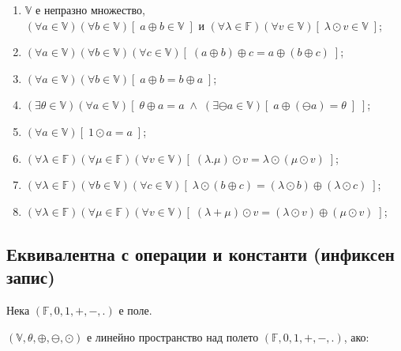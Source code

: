 \documentclass{article}[12pt]
\begin{document}
\begin{enumerate}
\item \(\mathbb{V}\) е непразно множество, \\
\((\forall a \in \mathbb{V})(\forall b \in \mathbb{V})[\; a \oplus b \in \mathbb{V}  \;]\)
и \((\forall \lambda \in \mathbb{F})(\forall v \in \mathbb{V})[\; \lambda \odot v \in \mathbb{V} \;]\);
\item \((\forall a \in \mathbb{V})(\forall b \in \mathbb{V})(\forall c \in \mathbb{V})[\; (a \oplus b) \oplus c = a \oplus (b \oplus c) \;]\);
\item \((\forall a \in \mathbb{V})(\forall b \in \mathbb{V})[\; a \oplus b = b \oplus a \;]\);
\item \((\exists \theta \in \mathbb{V})(\forall a \in \mathbb{V})[\; \theta \oplus a = a \; \land \; (\exists \ominus a \in \mathbb{V})[\; a \oplus (\ominus a) = \theta \;] \;]\);
\item \((\forall a \in \mathbb{V})[\; 1 \odot a = a \;]\);
\item \((\forall \lambda \in \mathbb{F})(\forall \mu \in \mathbb{F})(\forall v \in \mathbb{V})[\; (\lambda . \mu) \odot v = \lambda \odot (\mu \odot v) \;]\);
\item \((\forall \lambda \in \mathbb{F})(\forall b \in \mathbb{V})(\forall c \in \mathbb{V})[\; \lambda \odot (b \oplus c) = (\lambda \odot b) \oplus (\lambda \odot c) \;]\);
\item \((\forall \lambda \in \mathbb{F})(\forall \mu \in \mathbb{F})(\forall v \in \mathbb{V})[\; (\lambda + \mu) \odot v = (\lambda \odot v) \oplus (\mu \odot v) \;]\);
\end{enumerate}

\subsection{Еквивалентна с операции и константи (инфиксен запис)}

Нека \((\mathbb{F}, 0, 1, +, -, .)\) е поле.

\((\mathbb{V}, \theta, \oplus, \ominus, \odot)\) е линейно пространство над полето \((\mathbb{F}, 0, 1, +, -, .)\), ако:
\end{document}
